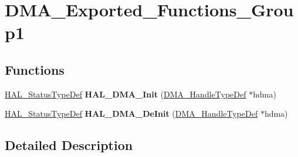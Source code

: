 \hypertarget{group___d_m_a___exported___functions___group1}{}\section{D\+M\+A\+\_\+\+Exported\+\_\+\+Functions\+\_\+\+Group1}
\label{group___d_m_a___exported___functions___group1}
\subsection*{Functions}
\begin{DoxyCompactItemize}
\item 
\mbox{\label{group___d_m_a___exported___functions___group1_ga0fbcb690074233a03f2fa366dc22ff01}} 
\hyperlink{stm32f0xx__hal__def_8h_a63c0679d1cb8b8c684fbb0632743478f}{H\+A\+L\+\_\+\+Status\+Type\+Def} {\bfseries H\+A\+L\+\_\+\+D\+M\+A\+\_\+\+Init} (\hyperlink{group___d_m_a___exported___types_ga92b907d56a9c29b93d46782a7a04f91e}{D\+M\+A\+\_\+\+Handle\+Type\+Def} $\ast$hdma)
\item 
\mbox{\label{group___d_m_a___exported___functions___group1_ga7bb8587d642da11252a97f5c41c389ef}} 
\hyperlink{stm32f0xx__hal__def_8h_a63c0679d1cb8b8c684fbb0632743478f}{H\+A\+L\+\_\+\+Status\+Type\+Def} {\bfseries H\+A\+L\+\_\+\+D\+M\+A\+\_\+\+De\+Init} (\hyperlink{group___d_m_a___exported___types_ga92b907d56a9c29b93d46782a7a04f91e}{D\+M\+A\+\_\+\+Handle\+Type\+Def} $\ast$hdma)
\end{DoxyCompactItemize}


\subsection{Detailed Description}
